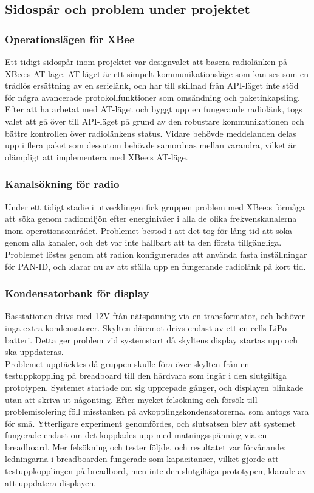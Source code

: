 \documentclass[a4paper,11pt]{article}
\begin{document}
\subsection{Sidospår och problem under projektet}

\subsubsection{Operationslägen för XBee}
Ett tidigt sidospår inom projektet var designvalet att basera radiolänken på XBee:s AT-läge. AT-läget är ett simpelt kommunikationsläge som kan ses som en trådlös ersättning av en serielänk, och har till skillnad från API-läget inte stöd för några avancerade protokollfunktioner som omsändning och paketinkapsling. Efter att ha arbetat med AT-läget och byggt upp en fungerande radiolänk, togs valet att gå över till API-läget på grund av den robustare kommunikationen och bättre kontrollen över radiolänkens status. Vidare behövde meddelanden delas upp i flera paket som dessutom behövde samordnas mellan varandra, vilket är olämpligt att implementera med XBee:s AT-läge.

\subsubsection{Kanalsökning för radio}
Under ett tidigt stadie i utvecklingen fick gruppen problem med XBee:s förmåga att söka genom radiomiljön efter energinivåer i alla de olika frekvenskanalerna inom operationsområdet. Problemet bestod i att det tog för lång tid att söka genom alla kanaler, och det var inte hållbart att ta den första tillgängliga. Problemet löstes genom att radion konfigurerades att använda fasta inställningar för PAN-ID, och klarar nu av att ställa upp en fungerande radiolänk på kort tid. 

\subsubsection{Kondensatorbank för display}
Basstationen drivs med 12V från nätspänning via en transformator, och behöver inga extra kondensatorer. Skylten däremot drivs endast av ett en-cells LiPo-batteri. Detta ger problem vid systemstart då skyltens display startas upp och ska uppdateras. \\

Problemet upptäcktes då gruppen skulle föra över skylten från en testuppkoppling på breadboard till den hårdvara som ingår i den slutgiltiga prototypen. Systemet startade om sig upprepade gånger, och displayen blinkade utan att skriva ut någonting. Efter mycket felsökning och försök till problemisolering föll misstanken på avkopplingskondensatorerna, som antogs vara för små. Ytterligare experiment genomfördes, och slutsatsen blev att systemet fungerade endast om det kopplades upp med matningsspänning via en breadboard. Mer felsökning och tester följde, och resultatet var förvånande: ledningarna i breadboarden fungerade som kapacitanser, vilket gjorde att testuppkopplingen på breadbord, men inte den slutgiltiga prototypen, klarade av att uppdatera displayen. \\
\end{document}
